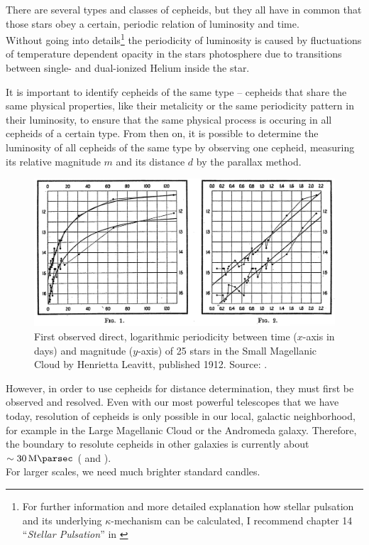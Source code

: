 There are several types and classes of cepheids, but they all have in common that those stars obey a certain, periodic relation of luminosity and time. \\

\noindent Without going into details\footnote{For further information and more detailed explanation how stellar pulsation and its underlying $\kappa$-mechanism can be calculated, I recommend chapter 14 ``\textit{Stellar Pulsation}'' in \cite{BradleyCarroll2007}} the periodicity of luminosity is caused by fluctuations of temperature dependent opacity in the stars photosphere due to transitions between single- and dual-ionized Helium inside the star. 

\noindent It is important to identify cepheids of the same type -- cepheids that share the same physical properties, like their metalicity or the same periodicity pattern in their luminosity, to ensure that the same physical process is occuring in all cepheids of a certain type.
\noindent From then on, it is possible to determine the luminosity of all cepheids of the same type by observing one cepheid, measuring its relative magnitude $m$ and its distance $d$ by the parallax method. \\

\begin{figure}[H]
    \centering
    \includegraphics[scale=0.3]{figures/images/leavitt_period-luminosity.png}
    \caption{First observed direct, logarithmic periodicity between time ($x$-axis in days) and magnitude ($y$-axis) of 25 stars in the Small Magellanic Cloud by Henrietta Leavitt, published 1912. Source: \cite{Leavitt1912}.}
\end{figure}


\noindent However, in order to use cepheids for distance determination, they must first be observed and resolved.
Even with our most powerful telescopes that we have today, resolution of cepheids is only possible in our local, galactic neighborhood, for example in the Large Magellanic Cloud or the Andromeda galaxy. Therefore, the boundary to resolute cepheids in other galaxies is currently about $\sim \SI{30}{\mega \parsec}$ (\cite[p.~47]{Bartelmann2019} and \cite[p.~3]{Engelmann2013}). \\
For larger scales, we need much brighter standard candles.




